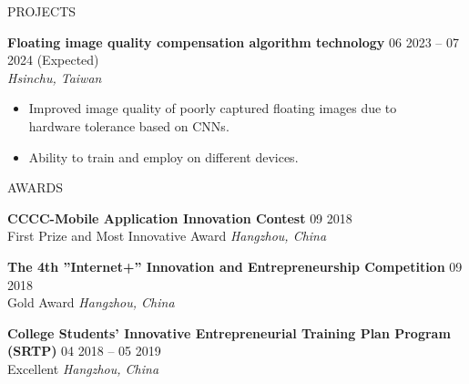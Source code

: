 \documentclass{resume}
\begin{document}
\begin{rSection}{PROJECTS}
    \item \textbf{Floating image quality compensation algorithm technology} \hfill {06 2023 -- 07 2024 (Expected)}\\
    \mbox{} \hfill \textit{Hsinchu, Taiwan}
    \begin{itemize}
        \item Improved image quality of poorly captured floating images due to\\hardware tolerance based on CNNs.
        \item Ability to train and employ on different devices.
    \end{itemize}
\end{rSection} 


\begin{rSection}{AWARDS}
\vspace{-1.25em}
    \item \textbf{CCCC-Mobile Application Innovation Contest} \hfill {09 2018}\\
    {First Prize and Most Innovative Award} \hfill \textit{Hangzhou, China}

    \item \textbf{The 4th ”Internet+” Innovation and Entrepreneurship Competition} \hfill {09 2018}\\
    {Gold Award} \hfill \textit{Hangzhou, China}

    \item \textbf{College Students’ Innovative Entrepreneurial Training Plan Program (SRTP)} \hfill {04 2018 -- 05 2019}\\
    {Excellent} \hfill \textit{Hangzhou, China}
\end{rSection} 


\end{document}
